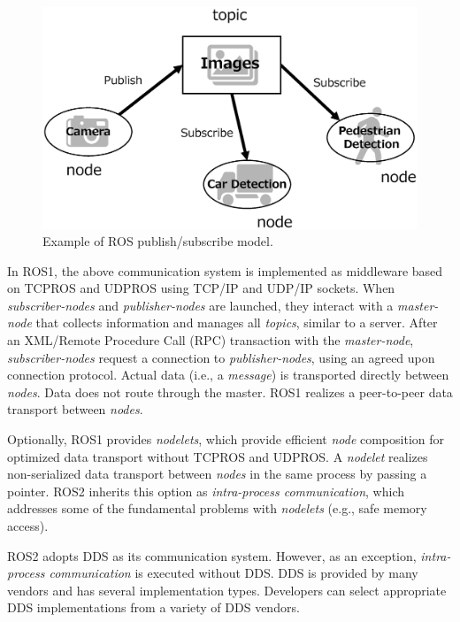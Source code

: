 \documentclass{sig-alternate-05-2015}
\begin{document}
\begin{figure}[t]
  \centering
  \includegraphics[width=0.8\linewidth]{../figure/ros_pubsub_fig.eps}
  \vspace{-5mm}
  \caption{\label{fig:orgparagraph2}
    Example of ROS publish/subscribe model.}
  \vspace{-6mm}
\end{figure}

In ROS1, the above communication system is implemented as middleware based on TCPROS and UDPROS using TCP/IP and UDP/IP sockets. 
When \emph{subscriber-nodes} and \emph{publisher-nodes} are launched, they interact with a \emph{master-node} that collects information and manages all \emph{topics}, similar to a server. 
After an XML/Remote Procedure Call (RPC) transaction with the \emph{master-node}, \emph{subscriber-nodes} request a connection to \emph{publisher-nodes}, using an agreed upon connection protocol. 
Actual data (i.e., a \emph{message}) is transported directly between \emph{nodes}. 
Data does not route through the master. 
ROS1 realizes a peer-to-peer data transport between \emph{nodes}. 

Optionally, ROS1 provides \emph{nodelets}, which provide efficient \emph{node} composition for optimized data transport without TCPROS and UDPROS. 
A \emph{nodelet} realizes non-serialized data transport between \emph{nodes} in the same process by passing a pointer. 
ROS2 inherits this option as \emph{intra-process communication}, which addresses some of the fundamental problems with \emph{nodelets} (e.g., safe memory access).

ROS2 adopts DDS as its communication system. However, as an exception, \emph{intra-process communication} is executed without DDS.
DDS is provided by many vendors and has several implementation types.
Developers can select appropriate DDS implementations from a variety of DDS vendors.

\vspace{-1mm}
\end{document}
